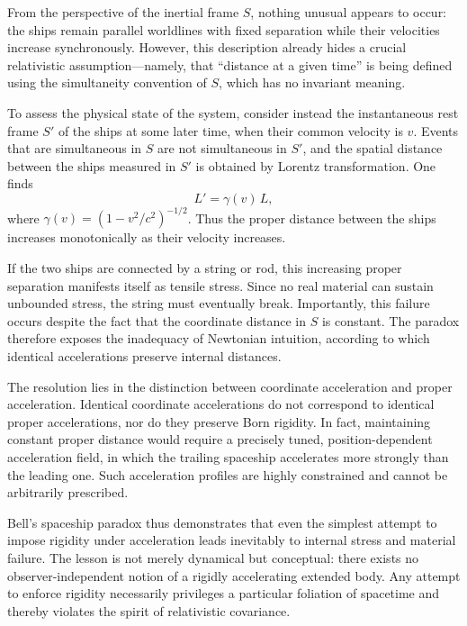 From the perspective of the inertial frame $S$, nothing unusual appears to
occur: the ships remain parallel worldlines with fixed separation while their
velocities increase synchronously. However, this description already hides a
crucial relativistic assumption—namely, that ``distance at a given time'' is
being defined using the simultaneity convention of $S$, which has no invariant
meaning.

To assess the physical state of the system, consider instead the instantaneous
rest frame $S'$ of the ships at some later time, when their common velocity is
$v$. Events that are simultaneous in $S$ are not simultaneous in $S'$, and the
spatial distance between the ships measured in $S'$ is obtained by Lorentz
transformation. One finds
\begin{equation}
L' = \gamma(v)\,L,
\end{equation}
where $\gamma(v) = (1 - v^2/c^2)^{-1/2}$. Thus the proper distance between the
ships increases monotonically as their velocity increases.

If the two ships are connected by a string or rod, this increasing proper
separation manifests itself as tensile stress. Since no real material can
sustain unbounded stress, the string must eventually break. Importantly, this
failure occurs despite the fact that the coordinate distance in $S$ is
constant. The paradox therefore exposes the inadequacy of Newtonian intuition,
according to which identical accelerations preserve internal distances.

The resolution lies in the distinction between coordinate acceleration and
proper acceleration. Identical coordinate accelerations do not correspond to
identical proper accelerations, nor do they preserve Born rigidity. In fact,
maintaining constant proper distance would require a precisely tuned,
position-dependent acceleration field, in which the trailing spaceship
accelerates more strongly than the leading one. Such acceleration profiles are
highly constrained and cannot be arbitrarily prescribed.

Bell's spaceship paradox thus demonstrates that even the simplest attempt to
impose rigidity under acceleration leads inevitably to internal stress and
material failure. The lesson is not merely dynamical but conceptual: there
exists no observer-independent notion of a rigidly accelerating extended body.
Any attempt to enforce rigidity necessarily privileges a particular foliation
of spacetime and thereby violates the spirit of relativistic covariance.

